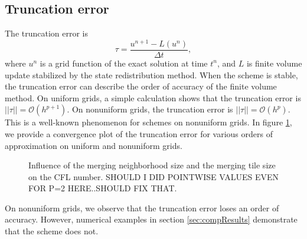 \subsection{Truncation error}
The truncation error is
$$
\tau = \frac{u^{n+1}- L(u^n)}{\Delta t},
$$
where $u^n$ is a grid function of the exact solution at time $t^n$, and $L$ is finite volume update stabilized by the state redistribution method.  
When the scheme is stable, the truncation error can describe the order of accuracy of the finite volume method.
On uniform grids, a simple calculation shows that the truncation error is $||\tau|| = \mathcal{O}(h^{p+1})$.  On nonuniform grids, the truncation error is $||\tau|| = \mathcal{O}(h^{p})$.  This is a well-known phenomenon for schemes on nonuniform grids.
In figure \ref{fig:truncationerror}, we provide a convergence plot of the truncation error for various orders of approximation on uniform and nonuniform grids.
\begin{figure}
    \centering
{} \hfill
{}
    \caption{Influence of the merging neighborhood size and the merging tile size on the CFL number.  SHOULD I DID POINTWISE VALUES EVEN FOR P=2 HERE..SHOULD FIX THAT.}
    \label{fig:truncationerror}
\end{figure}
On nonuniform grids, we observe that the truncation error loses an order of accuracy.  However, numerical examples in section \ref{sec:compResults} demonstrate that the scheme does not.

